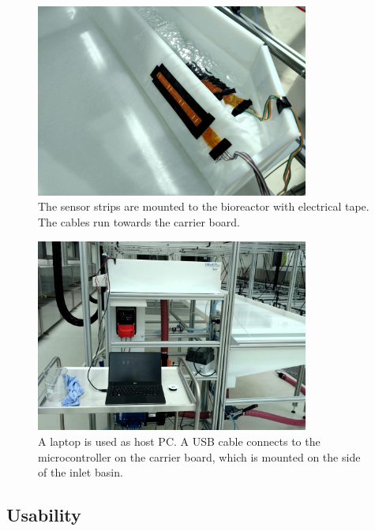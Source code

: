 \begin{figure}[H]
	\begin{center}
		\includegraphics[width=0.8\textwidth]{images/stripsinreactor.jpg} 
		\caption[The sensor strips are mounted to the bioreactor with electrical tape.]{The sensor strips are mounted to the bioreactor with electrical tape. The cables run towards the carrier board.}
	\label{fig:stripsr}
	\end{center}
\end{figure}

\begin{figure}[H]
	\begin{center}
		\includegraphics[width=0.8\textwidth]{images/pconreactor.jpg} 
		\caption[A laptop is used as host PC.]{A laptop is used as host PC. A USB cable connects to the microcontroller on the carrier board, which is mounted on the side of the inlet basin.}
	\label{fig:pcr}
	\end{center}
\end{figure}

\subsection{Usability}

